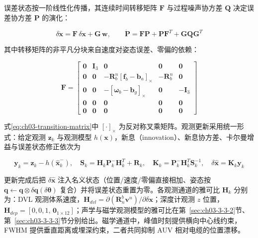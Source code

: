 误差状态按一阶线性化传播，其连续时间转移矩阵 \(\boldsymbol{F}\) 与过程噪声协方差 \(\boldsymbol{Q}\) 决定误差协方差 \(\boldsymbol{P}\) 的演化：

\begin{equation}
\delta\dot{\boldsymbol{x}} = \boldsymbol{F}\,\delta\boldsymbol{x} + \boldsymbol{G}\,\boldsymbol{w}, \qquad \dot{\boldsymbol{P}} = \boldsymbol{F}\boldsymbol{P} + \boldsymbol{P}\boldsymbol{F}^T + \boldsymbol{G}\boldsymbol{Q}\boldsymbol{G}^T
\label{eq:ch03-error-propagation}
\end{equation}

其中转移矩阵的非平凡分块来自速度对姿态误差、零偏的依赖：

\begin{equation}
\boldsymbol{F} = \begin{bmatrix} \boldsymbol{0} & \boldsymbol{I}_3 & \boldsymbol{0} & \boldsymbol{0} & \boldsymbol{0} \\ \boldsymbol{0} & \boldsymbol{0} & -\boldsymbol{R}_b^n[\boldsymbol{f}_b - \boldsymbol{b}_a]_\times & -\boldsymbol{R}_b^n & \boldsymbol{0} \\ \boldsymbol{0} & \boldsymbol{0} & -[\boldsymbol{\omega}_b - \boldsymbol{b}_g]_\times & \boldsymbol{0} & -\boldsymbol{I}_3 \\ \boldsymbol{0} & \boldsymbol{0} & \boldsymbol{0} & \boldsymbol{0} & \boldsymbol{0} \\ \boldsymbol{0} & \boldsymbol{0} & \boldsymbol{0} & \boldsymbol{0} & \boldsymbol{0} \end{bmatrix}
\label{eq:ch03-transition-matrix}
\end{equation}

式\eqref{eq:ch03-transition-matrix}中 \([\cdot]_\times\) 为反对称叉乘矩阵。观测更新采用统一形式：给定观测 \(\boldsymbol{z}_k\) 与观测模型 \(h(\boldsymbol{x})\)，新息（innovation）、新息协方差、卡尔曼增益与误差状态修正依次为

\begin{equation}
\boldsymbol{y}_k = \boldsymbol{z}_k - h(\hat{\boldsymbol{x}}_k^-), \quad \boldsymbol{S}_k = \boldsymbol{H}_k\boldsymbol{P}_k^-\boldsymbol{H}_k^T + \boldsymbol{R}_k, \quad \boldsymbol{K}_k = \boldsymbol{P}_k^-\boldsymbol{H}_k^T\boldsymbol{S}_k^{-1}, \quad \delta\hat{\boldsymbol{x}} = \boldsymbol{K}_k\boldsymbol{y}_k
\label{eq:ch03-measurement-update}
\end{equation}

更新完成后把 \(\delta\hat{\boldsymbol{x}}\) 注入名义状态（位置/速度/零偏直接相加、姿态按 \(\boldsymbol{q} \leftarrow \boldsymbol{q}\otimes\delta\boldsymbol{q}(\delta\boldsymbol{\theta})\) 复合）并将误差状态重置为零。各观测通道的雅可比 \(\boldsymbol{H}_k\) 分别为：DVL 观测体系速度，\(\boldsymbol{H}_{dvl} = \partial(\boldsymbol{R}_n^b\boldsymbol{v}^n)/\partial\delta\boldsymbol{x}\)；深度计观测 \(z\) 位置，\(\boldsymbol{H}_{dep} = [0,0,1,\,\boldsymbol{0}_{1\times12}]\)；声学与磁学观测模型的雅可比在第~\ref{sec:ch03-3-3-2}节、第~\ref{sec:ch03-3-3-3}节分别给出。磁学通道中，峰值时刻提供横向中心线约束，FWHM 提供垂直距离或埋深约束，二者共同抑制 AUV 相对电缆的位置漂移。

